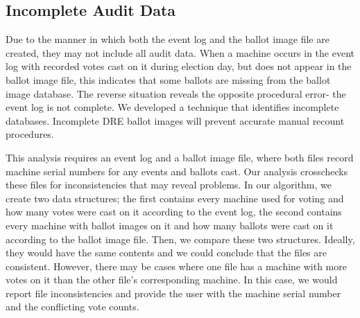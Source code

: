 \subsection{Incomplete Audit Data}
Due to the manner in which both the event log and the ballot image file are created, they may not include all audit data. When a machine occurs in the event log with recorded votes cast on it during election day, but does not appear in the ballot image file, this indicates that some ballots are missing from the ballot image database.  The reverse situation reveals the opposite procedural error- the event log is not complete.  We developed a technique that identifies incomplete databases.  Incomplete DRE ballot images will prevent accurate manual recount procedures.

This analysis requires an event log and a ballot image file, where both files record machine serial numbers for any events and ballots cast.  Our analysis crosschecks these files for inconsistencies that may reveal problems.  In our algorithm, we create two data structures; the first contains every machine used for voting and how many votes were cast on it according to the event log, the second contains every machine with ballot images on it and how many ballots were cast on it according to the ballot image file.  Then, we compare these two structures.  Ideally, they would have the same contents and we could conclude that the files are consistent.  However, there may be cases where one file has a machine with more votes on it than the other file's corresponding machine.  In this case, we would report file inconsistencies and provide the user with the machine serial number and the conflicting vote counts.     
